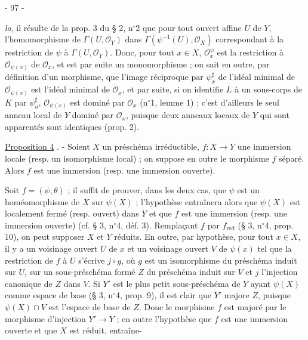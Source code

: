 \newpage


- 97 -

\textit{la}, il résulte de la prop. 3 du § 2, n$^\circ$2 que pour tout ouvert affine $U$ de $Y$, l'homomorphisme de $\Gamma(U, \mathcal{O}_Y)$ dans $\Gamma(\psi^{-1}(U), \mathcal{O}_X)$ correspondant à la restriction de $\psi$ à $\Gamma(U, \mathcal{O}_Y)$. Donc, pour tout $x \in X$, $\mathcal{O}_{x}^{\psi}$ est la restriction à $\mathcal{O}_{\psi(x)}$ de $\mathcal{O}_x$, et est par suite un monomorphisme ; on sait en outre, par définition d'un morphisme, que l'image réciproque par $\psi_x^\sharp$ de l'idéal minimal de $\mathcal{O}_{\psi(x)}$ est l'idéal minimal de $\mathcal{O}_x$, et par suite, si on identifie $L$ à un sous-corps de $K$ par $\psi_a^\sharp$, $\mathcal{O}_{\psi(x)}$ est dominé par $\mathcal{O}_x$ (n$^\circ$1, lemme 1) ; c'est d'ailleurs le seul anneau local de $Y$ dominé par $\mathcal{O}_x$, puisque deux anneaux locaux de $Y$ qui sont apparentés sont identiques (prop. 2).

\underline{Proposition 4} . - Soient $X$ un préschéma irréductible, $f : X \to Y$ une immersion locale (resp. un isomorphisme local) ; on suppose en outre le morphisme $f$ séparé. Alors $f$ est une immersion (resp. une immersion ouverte).

Soit $f = (\psi, \theta)$ ; il suffit de prouver, dans les deux cas, que $\psi$ est un homéomorphisme de $X$ sur $\psi(X)$ ; l'hypothèse entraînera alors que $\psi(X)$ est localement fermé (resp. ouvert) dans $Y$ et que $f$ est une immersion (resp. une immersion ouverte) (cf. § 3, n$^\circ$4, déf. 3). Remplaçant $f$ par $f_{\operatorname{red}}$ (§ 3, n$^\circ$4, prop. 10), on peut supposer $X$ et $Y$ réduits. En outre, par hypothèse, pour tout $x \in X$, il y a un voisinage ouvert $U$ de $x$ et un voisinage ouvert $V$ de $\psi(x)$ tel que la restriction de $f$ à $U$ s'écrive $j \circ g$, où $g$ est un isomorphisme du préschéma induit sur $U$, sur un sous-préschéma formé $Z$ du préschéma induit sur $V$ et $j$ l'injection canonique de $Z$ dans $V$. Si $Y'$ est le plus petit sous-préschéma de $Y$ ayant $\psi(X)$ comme espace de base (§ 3, n$^\circ$4, prop. 9), il est clair que $Y'$ majore $Z$, puisque $\psi(X) \cap V$ est l'espace de base de $Z$. Donc le morphisme $f$ est majoré par le morphisme d'injection $Y' \to Y$ ; en outre l'hypothèse que $f$ est une immersion ouverte et que $X$ est réduit, entraîne-

\newpage


